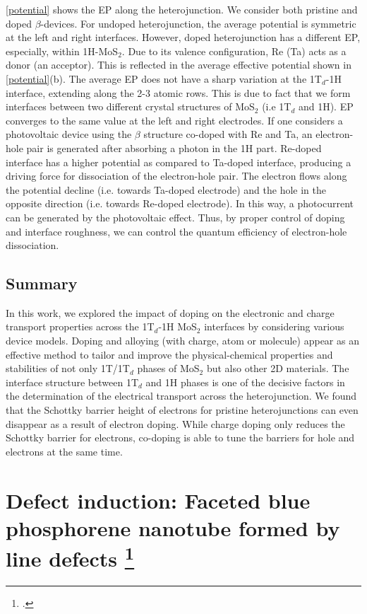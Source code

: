 \autoref{potential} shows the EP along the heterojunction. We consider both pristine and doped $\beta$-devices. 
For undoped heterojunction, the average potential is symmetric at the left and right interfaces.
However, doped heterojunction has a  different EP, especially, within 1H-MoS$_2$. 
Due to its valence configuration, Re (Ta) acts as a donor (an acceptor). 
This is reflected in the average effective potential shown in \autoref{potential}(b).
The average EP does not have a sharp variation at the 1T$_d$-1H interface, extending along the 2-3 atomic rows.  
This is due to fact that we form interfaces between two different crystal structures of MoS$_2$ (i.e 1T$_d$ and 1H). EP converges to  the same value at the left and right electrodes. 
If one considers a photovoltaic device using the  $\beta$ structure co-doped with Re and Ta, 
an electron-hole pair is generated after absorbing a photon in the 1H part. 
Re-doped interface has a higher potential as compared to Ta-doped interface, producing a driving force for dissociation of the electron-hole pair. 
The electron flows along the potential decline (i.e. towards Ta-doped electrode)
and the hole in the opposite direction (i.e. towards Re-doped electrode).
In this way,  a photocurrent can be  generated by the photovoltaic effect. Thus, by proper control of doping and interface roughness, we 
can control the quantum efficiency of electron-hole dissociation\cite{doi:10.1021/acs.jpclett.7b00518}. 

\subsection{Summary}
In this work, we explored the impact of doping on the electronic and charge transport properties across the 1T$_d$-1H MoS$_2$ interfaces by considering various device models. 
Doping and alloying (with charge, atom or molecule) 
appear as an effective method to tailor and improve the physical-chemical properties and stabilities of not 
only 1T/1T$_d$ phases of MoS$_2$ but also other 2D materials. 
The interface structure between 1T$_d$ and 1H phases is one of the decisive factors in the determination of the electrical transport across the heterojunction. 
We found that the Schottky barrier height of electrons for  pristine heterojunctions  can even disappear as a result of electron doping. 
While charge doping only reduces the Schottky barrier for electrons, co-doping is able to tune the barriers for
hole and electrons at the same time.

\section[Defect induction: Faceted blue phosphorene nanotube formed by line defects]{Defect induction: Faceted blue phosphorene nanotube formed by line defects \footcite[This work is published in:][]{Aierken2015.nanotubes} \label{defect_phos}}

